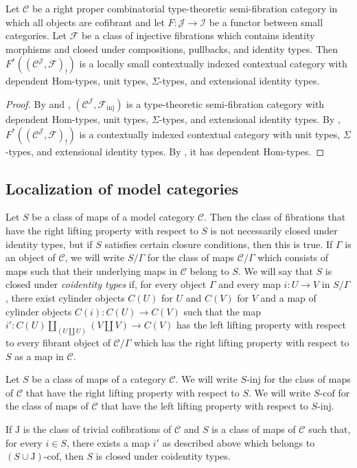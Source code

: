 \documentclass[reqno]{amsart}
\theoremstyle{definition}
\theoremstyle{remark}
\newcommand{\fs}[1]{\mathrm{#1}}
\newcommand{\scat}[1]{\mathcal{#1}}
\newcommand{\Fib}{\mathcal{F}}
\newcommand{\Hom}{\fs{Hom}}
\newcommand{\class}[2]{#1\text{-}\mathrm{#2}}
\newcommand{\I}{\mathrm{I}}
\newcommand{\J}{\mathrm{J}}
\newcommand{\Icof}[1][\I]{\class{#1}{cof}}
\newcommand{\Iinj}[1][\I]{\class{#1}{inj}}
\numberwithin{figure}{section}
\begin{document}
\begin{thm}
Let $\scat{C}$ be a right proper combinatorial type-theoretic semi-fibration category in which all objects are cofibrant and let $F : \scat{J} \to \scat{I}$ be a functor between small categories.
Let $\Fib$ be a class of injective fibrations which contains identity morphisms and closed under compositions, pullbacks, and identity types.
Then $F^*((\scat{C}^\scat{J},\Fib)_!)$ is a locally small contextually indexed contextual category with dependent $\Hom$-types, unit types, $\Sigma$-types, and extensional identity types.
\end{thm}
\begin{proof}
By  and , $(\scat{C}^\scat{J},\Fib_\fs{inj})$ is a type-theoretic semi-fibration category with dependent $\Hom$-types, unit types, $\Sigma$-types, and extensional identity types.
By , $F^*((\scat{C}^\scat{J},\Fib)_!)$ is a contextually indexed contextual category with unit types, $\Sigma$-types, and extensional identity types.
By , it has dependent $\Hom$-types.
\end{proof}

\subsection{Localization of model categories}

Let $S$ be a class of maps of a model category $\scat{C}$.
Then the class of fibrations that have the right lifting property with respect to $S$ is not necessarily closed under identity types, but if $S$ satisfies certain closure conditions, then this is true.
If $\Gamma$ is an object of $\scat{C}$, we will write $S/\Gamma$ for the class of maps $\scat{C}/\Gamma$ which consists of maps such that their underlying maps in $\scat{C}$ belong to $S$.
We will say that $S$ is closed under \emph{coidentity types} if, for every object $\Gamma$ and every map $i : U \to V$ in $S/\Gamma$, there exist cylinder objects $C(U)$ for $U$ and $C(V)$ for $V$
and a map of cylinder objects $C(i) : C(U) \to C(V)$ such that the map $i' : C(U) \amalg_{(U \amalg U)} (V \amalg V) \to C(V)$
has the left lifting property with respect to every fibrant object of $\scat{C}/\Gamma$ which has the right lifting property with respect to $S$ as a map in $\scat{C}$.

\begin{remark}[coidentity]
Let $S$ be a class of maps of a category $\scat{C}$.
We will write $\Iinj[S]$ for the class of maps of $\scat{C}$ that have the right lifting property with respect to $S$.
We will write $\Icof[S]$ for the class of maps of $\scat{C}$ that have the left lifting property with respect to $\Iinj[S]$.

If $\J$ is the class of trivial cofibrations of $\scat{C}$ and $S$ is a class of maps of $\scat{C}$ such that, for every $i \in S$, there exists a map $i'$ as described above which belongs to $\Icof[(S \cup \J)]$, then $S$ is closed under coidentity types.
\end{remark}
\end{document}
